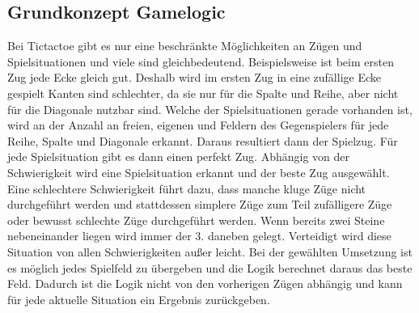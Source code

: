 \subsection{Grundkonzept Gamelogic}
Bei Tictactoe gibt es nur eine beschränkte Möglichkeiten an Zügen und Spielsituationen und viele sind gleichbedeutend. Beispielsweise ist beim ersten Zug jede Ecke gleich gut. Deshalb wird im ersten Zug in eine zufällige Ecke gespielt Kanten sind schlechter, da sie nur für die Spalte und Reihe, aber nicht für die Diagonale nutzbar sind. Welche der Spielsituationen gerade vorhanden ist, wird an der Anzahl an freien, eigenen und Feldern des Gegenspielers für jede Reihe, Spalte und Diagonale erkannt. Daraus resultiert dann der Spielzug. Für jede Spielsituation gibt es dann einen perfekt Zug. Abhängig von der Schwierigkeit wird eine Spielsituation erkannt und der beste Zug ausgewählt. Eine schlechtere Schwierigkeit führt dazu, dass manche kluge Züge nicht durchgeführt werden und stattdessen simplere Züge zum Teil zufälligere Züge oder bewusst schlechte Züge durchgeführt werden. 
Wenn bereits zwei Steine nebeneinander liegen wird immer der 3. daneben gelegt. Verteidigt wird diese Situation von allen Schwierigkeiten außer leicht.
Bei der gewählten Umsetzung ist es möglich jedes Spielfeld zu übergeben und die Logik berechnet daraus das beste Feld. Dadurch ist die Logik nicht von den vorherigen Zügen abhängig und kann für jede aktuelle Situation ein Ergebnis zurückgeben.
